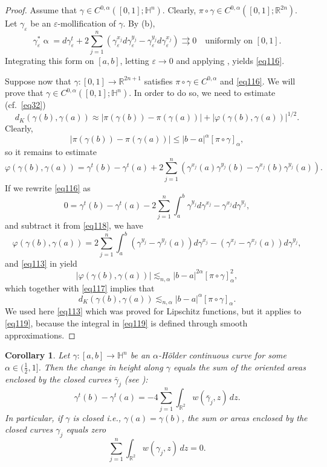 \documentclass[intlimits,12pt,reqno]{amsart}
\newcommand{\bbbh}{\mathbb H}
\newcommand{\R}{\mathbb R}
\newcommand{\eps}{\varepsilon}
\numberwithin{equation}{section}
\newtheorem{corollary}[theorem]{Corollary}
\theoremstyle{definition}
\begin{document}
\begin{proof}
Assume that $\gamma\in C^{0,\alpha}([0,1];\bbbh^n)$. Clearly, $\pi\circ\gamma\in C^{0,\alpha}([0,1];\R^{2n})$.
Let $\gamma_\eps$ be an $\eps$-mollification of $\gamma$. By (b),
$$
\gamma_\eps^*\upalpha=
d\gamma_\eps^t+2\sum_{j=1}^n 
(\gamma_\eps^{x_j}d\gamma_\eps^{y_j}-\gamma_\eps^{y_j}d\gamma_\eps^{x_j})\rightrightarrows 0
\quad
\text{uniformly on $[0,1]$.}
$$
Integrating this form on $[a,b]$, letting $\eps\to 0$ and applying , yields \eqref{eq116}.

Suppose now that $\gamma:[0,1]\to \R^{2n+1}$ satisfies
$\pi\circ\gamma\in C^{0,\alpha}$ and \eqref{eq116}. We will prove that $\gamma\in C^{0,\alpha}([0,1];\bbbh^n)$. In order to do so, we need to estimate (cf.\ \eqref{eq32})
$$
d_K(\gamma(b),\gamma(a))\approx
|\pi(\gamma(b))-\pi(\gamma(a))|+|\varphi(\gamma(b),\gamma(a))|^{1/2}.
$$
Clearly,
\begin{equation}
\label{eq117}
|\pi(\gamma(b))-\pi(\gamma(a))|\leq |b-a|^\alpha[\pi\circ\gamma]_\alpha,
\end{equation}
so it remains to estimate 
\begin{equation}
\label{eq118}
\varphi(\gamma(b),\gamma(a))=\gamma^t(b)-\gamma^t(a)+
2\sum_{j=1}^n (\gamma^{x_j}(a)\gamma^{y_j}(b)-\gamma^{x_j}(b)\gamma^{y_j}(a)).
\end{equation}
If we rewrite \eqref{eq116} as
$$
0=\gamma^t(b)-\gamma^t(a)-2\sum_{j=1}^n \int_a^b \gamma^{y_j}d\gamma^{x_j}-\gamma^{x_j}d\gamma^{y_j},
$$
and subtract it from \eqref{eq118}, we have
\begin{equation}
\label{eq119}
\varphi(\gamma(b),\gamma(a))=
2\sum_{j=1}^n \int_a^b (\gamma^{y_j}-\gamma^{y_j}(a))d\gamma^{x_j}-(\gamma^{x_j}-\gamma^{x_j}(a))d\gamma^{y_j},
\end{equation}
and \eqref{eq113} in  yield
$$
|\varphi(\gamma(b),\gamma(a))|\lesssim_{n,\alpha} |b-a|^{2\alpha}[\pi\circ\gamma]^2_{\alpha},
$$
which together with \eqref{eq117} implies that
$$
d_K(\gamma(b),\gamma(a))\lesssim_{n,\alpha} |b-a|^\alpha[\pi\circ\gamma]_\alpha.
$$
We used here \eqref{eq113} which was proved for Lipschitz functions, but it applies to \eqref{eq119}, because the integral in \eqref{eq119} is defined through smooth approximations.
\end{proof}
\begin{corollary}
\label{T90}
Let $\gamma:[a,b]\to\bbbh^n$ be an $\alpha$-H\"older continuous curve for some $\alpha\in(\frac{1}{2},1]$. Then the change in height along $\gamma$ equals the sum of the oriented areas enclosed by the closed curves $\bar{\gamma}_j$ (see ):
$$
\gamma^t(b)-\gamma^t(a)=-4\sum_{j=1}^n\int_{\R^2} w(\bar{\gamma}_j,z)\, dz.
$$
In particular, if $\gamma$ is closed i.e., $\gamma(a)=\gamma(b)$, the sum or areas enclosed by the closed curves $\gamma_j$ equals zero
$$
\sum_{j=1}^n \int_{\R^2} w(\gamma_j,z)\, dz=0.
$$
\end{corollary}
\end{document}
